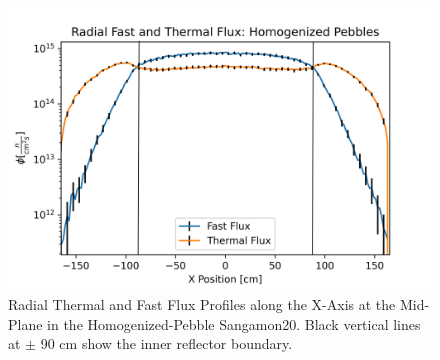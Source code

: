 \begin{figure}[H]
\centering

  \includegraphics[width=0.95\linewidth]{figures/fast_therm_flux_homogv2.png}

\caption{Radial Thermal and Fast Flux Profiles along the X-Axis at the Mid-Plane in the Homogenized-Pebble Sangamon20.  Black vertical lines at $\pm$ 90 cm show the inner reflector boundary.}
\label{fig:hom-det-xy}
\end{figure}